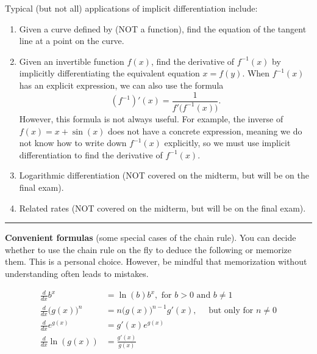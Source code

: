 \documentclass[../main.tex]{subfiles}
\begin{document}
Typical (but not all) applications of implicit differentiation include:
\begin{enumerate}
  \item Given a curve defined by  (NOT a function), find the equation of the tangent line at a point on the curve.
  \item Given an invertible function \(f(x)\), find the derivative of \(f^{-1}(x)\) by implicitly differentiating the equivalent equation \(x = f(y)\). When \(f^{-1}(x)\) has an explicit expression, we can also use the formula
    \[
      \left(f^{-1}\right)'(x) = \frac{1}{f'\big(f^{-1}(x)\big)}.
    \]
    However, this formula is not always useful. For example, the inverse of \(f(x) = x + \sin(x)\) does not have a concrete expression, meaning we do not know how to write down \(f^{-1}(x)\) explicitly, so we must use implicit differentiation to find the derivative of \(f^{-1}(x)\).

  \item Logarithmic differentiation (NOT covered on the midterm, but will be on the final exam).

  \item Related rates (NOT covered on the midterm, but will be on the final exam).
\end{enumerate}

\medskip
\hrule

\textbf{Convenient formulas} (some special cases of the chain rule). You can decide whether to use the chain rule on the fly to deduce the following or memorize them. This is a personal choice. However, be mindful that memorization without understanding often leads to mistakes.

\begin{align*}
  \frac{d}{dx} b^{x} &= \ln(b) b^{x}, \text{ for } b > 0 \text{ and } b \ne 1 \\[2ex]
  \frac{d}{dx} \bigg( g(x) \bigg)^{n} &= n \bigg( g(x) \bigg)^{n-1} g'(x), \quad\text{ but only for } n \ne 0 \\[2ex]
  \frac{d}{dx} e^{g(x)} &= g'(x)e^{g(x)}  \\[2ex]
  \frac{d}{dx} \ln(g(x)) &= \frac{g'(x)}{g(x)}
\end{align*}

\end{document}
